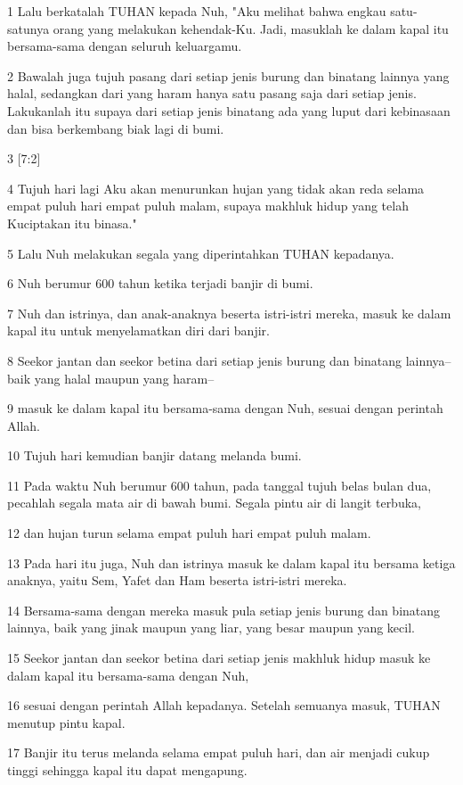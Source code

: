 \par 1 Lalu berkatalah TUHAN kepada Nuh, "Aku melihat bahwa engkau satu-satunya orang yang melakukan kehendak-Ku. Jadi, masuklah ke dalam kapal itu bersama-sama dengan seluruh keluargamu.
\par 2 Bawalah juga tujuh pasang dari setiap jenis burung dan binatang lainnya yang halal, sedangkan dari yang haram hanya satu pasang saja dari setiap jenis. Lakukanlah itu supaya dari setiap jenis binatang ada yang luput dari kebinasaan dan bisa berkembang biak lagi di bumi.
\par 3 [7:2]
\par 4 Tujuh hari lagi Aku akan menurunkan hujan yang tidak akan reda selama empat puluh hari empat puluh malam, supaya makhluk hidup yang telah Kuciptakan itu binasa."
\par 5 Lalu Nuh melakukan segala yang diperintahkan TUHAN kepadanya.
\par 6 Nuh berumur 600 tahun ketika terjadi banjir di bumi.
\par 7 Nuh dan istrinya, dan anak-anaknya beserta istri-istri mereka, masuk ke dalam kapal itu untuk menyelamatkan diri dari banjir.
\par 8 Seekor jantan dan seekor betina dari setiap jenis burung dan binatang lainnya--baik yang halal maupun yang haram--
\par 9 masuk ke dalam kapal itu bersama-sama dengan Nuh, sesuai dengan perintah Allah.
\par 10 Tujuh hari kemudian banjir datang melanda bumi.
\par 11 Pada waktu Nuh berumur 600 tahun, pada tanggal tujuh belas bulan dua, pecahlah segala mata air di bawah bumi. Segala pintu air di langit terbuka,
\par 12 dan hujan turun selama empat puluh hari empat puluh malam.
\par 13 Pada hari itu juga, Nuh dan istrinya masuk ke dalam kapal itu bersama ketiga anaknya, yaitu Sem, Yafet dan Ham beserta istri-istri mereka.
\par 14 Bersama-sama dengan mereka masuk pula setiap jenis burung dan binatang lainnya, baik yang jinak maupun yang liar, yang besar maupun yang kecil.
\par 15 Seekor jantan dan seekor betina dari setiap jenis makhluk hidup masuk ke dalam kapal itu bersama-sama dengan Nuh,
\par 16 sesuai dengan perintah Allah kepadanya. Setelah semuanya masuk, TUHAN menutup pintu kapal.
\par 17 Banjir itu terus melanda selama empat puluh hari, dan air menjadi cukup tinggi sehingga kapal itu dapat mengapung.
